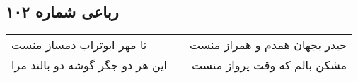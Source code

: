 \begin{center}
\section*{رباعی شماره ۱۰۲}
\label{sec:sh102}
\begin{longtable}{l p{0.5cm} r}
تا مهر ابوتراب دمساز منست
&&
حیدر بجهان همدم و همراز منست
\\
این هر دو جگر گوشه دو بالند مرا
&&
مشکن بالم که وقت پرواز منست
\\
\end{longtable}
\end{center}
